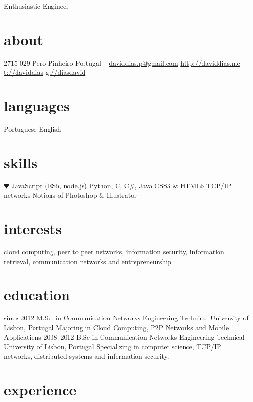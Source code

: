 \documentclass[]{friggeri-cv}
\begin{document}
       {Enthusiastic Engineer}

\begin{aside}
  \section{about}
    2715-029 Pero Pinheiro
    Portugal
    ~
    \href{mailto:daviddias.p@gmail.com}{daviddias.p@gmail.com}
    \href{http://daviddias.me}{http://daviddias.me}
    \href{https://twitter.com/daviddias}{t://daviddias}
    \href{https://github.com/diasdavid}{g://diasdavid}
  \section{languages}
    Portuguese
    English
  \section{skills}
    {\color{red} $\varheartsuit$} JavaScript
    (ES5, node.js)
    Python, C, C\#, Java
    CSS3 \& HTML5
    TCP/IP networks
    Notions of Photoshop \& Illustrator

\end{aside}

\section{interests}

cloud computing, peer to peer networks, information security, information retrieval, communication networks and entrepreneurship

\section{education}

\begin{entrylist}
  \entry
    {since 2012}
    {M.Sc. in Communication Networks Engineering}
    {Technical University of Lisbon, Portugal}
    {Majoring in Cloud Computing, P2P Networks and Mobile Applications}
  \entry
    {2008–2012}
    {B.Sc in Communication Networks Engineering}
    {Technical University of Lisbon, Portugal}
    {Specializing in computer science, TCP/IP networks, distributed systems and information security.}
\end{entrylist}

\section{experience}
\end{document}
